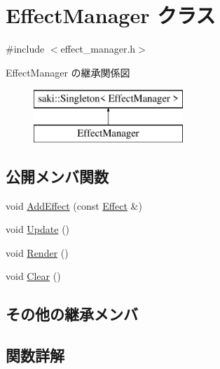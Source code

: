 \hypertarget{class_effect_manager}{}\section{Effect\+Manager クラス}
\label{class_effect_manager}


{\ttfamily \#include $<$effect\+\_\+manager.\+h$>$}

Effect\+Manager の継承関係図\begin{figure}[H]
\begin{center}
\leavevmode
\includegraphics[height=2.000000cm]{class_effect_manager}
\end{center}
\end{figure}
\subsection*{公開メンバ関数}
\begin{DoxyCompactItemize}
\item 
void \mbox{\hyperlink{class_effect_manager_a427e9793802dce8d42a74723f44696fe}{Add\+Effect}} (const \mbox{\hyperlink{class_effect}{Effect}} \&)
\item 
void \mbox{\hyperlink{class_effect_manager_a966fbd56f3cf4763bc3a52fc5b8f4eff}{Update}} ()
\item 
void \mbox{\hyperlink{class_effect_manager_af5beef30ba12cb8c779b2c8d0ae55861}{Render}} ()
\item 
void \mbox{\hyperlink{class_effect_manager_a4efa9673f06df792679389b3c909bbc9}{Clear}} ()
\end{DoxyCompactItemize}
\subsection*{その他の継承メンバ}


\subsection{関数詳解}
\mbox{\label{class_effect_manager_a427e9793802dce8d42a74723f44696fe}} 
